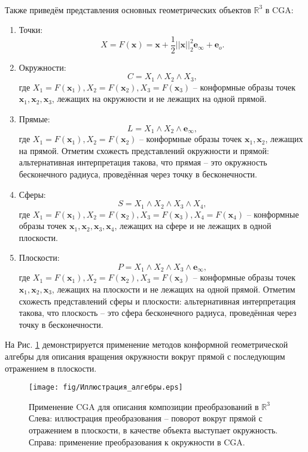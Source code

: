\documentclass[12pt]{article}
\begin{document}
\paragraph{}
Также приведём представления основных геометрических объектов $\mathds{R}^3$ в CGA:
\begin{enumerate}
    \item Точки: 
    $$X = F(\mathbf{x}) =  \mathbf{x} + \frac{1}{2}||\mathbf{x}||_2^2 \mathbf{e}_{\infty} + \mathbf{e}_o.$$
    \item Окружности: 
    $$C = X_1 \wedge X_2 \wedge X_3,$$ 
    где $X_1 = F(\mathbf{x}_1), X_2 = F(\mathbf{x}_2), X_3 = F(\mathbf{x}_3)$ -- конформные образы точек $\mathbf{x}_1, \mathbf{x}_2, \mathbf{x}_3$, лежащих на окружности и не лежащих на одной прямой.
    \item Прямые: 
    $$L = X_1 \wedge X_2 \wedge \mathbf{e}_{\infty},$$
    где $X_1 = F(\mathbf{x}_1), X_2 = F(\mathbf{x}_2)$ -- конформные образы точек $\mathbf{x}_1, \mathbf{x}_2$, лежащих на прямой. Отметим схожесть представлений окружности и прямой: альтернативная интерпретация такова, что прямая -- это окружность бесконечного радиуса, проведённая через точку в бесконечности.
    \item Сферы: 
    $$S = X_1 \wedge X_2 \wedge X_3 \wedge X_4,$$ 
    где $X_1 = F(\mathbf{x}_1), X_2 = F(\mathbf{x}_2), X_3 = F(\mathbf{x}_3), X_4 = F(\mathbf{x}_4)$ -- конформные образы точек $\mathbf{x}_1, \mathbf{x}_2, \mathbf{x}_3, \mathbf{x}_4$, лежащих на сфере и не лежащих в одной плоскости.
    \item Плоскости: 
    $$P = X_1 \wedge X_2 \wedge X_3 \wedge \mathbf{e}_{\infty},$$ 
    где $X_1 = F(\mathbf{x}_1), X_2 = F(\mathbf{x}_2), X_3 = F(\mathbf{x}_3)$ -- конформные образы точек $\mathbf{x}_1, \mathbf{x}_2, \mathbf{x}_3$, лежащих на плоскости и не лежащих на одной прямой. Отметим схожесть представлений сферы и плоскости: альтернативная интерпретация такова, что плоскость -- это сфера бесконечного радиуса, проведённая через точку в бесконечности.
\end{enumerate}

\vspace{0.5cm}

На Рис. \ref{fig:CGA_in_action} демонстрируется применение методов конформной геометрической алгебры для описания вращения окружности вокруг прямой с последующим отражением в плоскости.

\begin{figure}[h]
    \centering
    \texttt{[image: fig/Иллюстрация\_алгебры.eps]}
    \caption{Применение CGA для описания композиции преобразований в $\mathds{R}^3$ Слева: иллюстрация преобразования -- поворот вокруг прямой с отражением в плоскости, в качестве объекта выступает окружность. Справа: применение преобразования к окружности в CGA.}
    \label{fig:CGA_in_action}
\end{figure}
\end{document}
